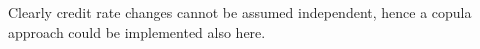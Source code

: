 Clearly credit rate changes cannot be assumed independent, hence a copula approach could be implemented also here.
%
%		
%				
